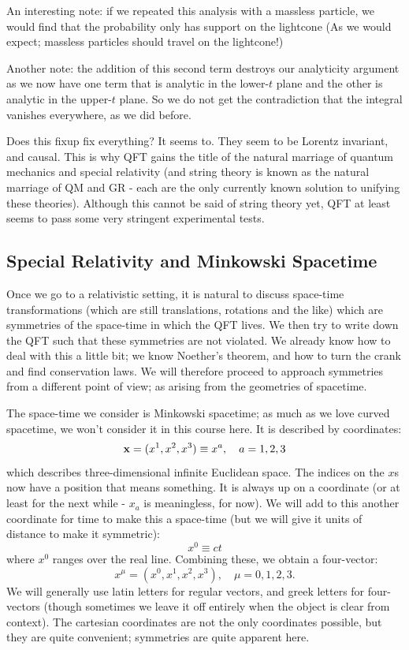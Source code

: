 An interesting note: if we repeated this analysis with a massless particle, we would find that the probability only has support on the lightcone (As we would expect; massless particles should travel on the lightcone!)

Another note: the addition of this second term destroys our analyticity argument as we now have one term that is analytic in the lower-$t$ plane and the other is analytic in the upper-$t$ plane. So we do not get the contradiction that the integral vanishes everywhere, as we did before.

Does this fixup fix everything? It seems to. They seem to be Lorentz invariant, and causal. This is why QFT gains the title of the natural marriage of quantum mechanics and special relativity (and string theory is known as the natural marriage of QM and GR - each are the only currently known solution to unifying these theories). Although this cannot be said of string theory yet, QFT at least seems to pass some very stringent experimental tests.

\subsection{Special Relativity and Minkowski Spacetime}
Once we go to a relativistic setting, it is natural to discuss space-time transformations (which are still translations, rotations and the like) which are symmetries of the space-time in which the QFT lives. We then try to write down the QFT such that these symmetries are not violated. We already know how to deal with this a little bit; we know Noether's theorem, and how to turn the crank and find conservation laws. We will therefore proceed to approach symmetries from a different point of view; as arising from the geometries of spacetime.

The space-time we consider is Minkowski spacetime; as much as we love curved spacetime, we won't consider it in this course here. It is described by coordinates:
\begin{equation}
    \mathbf{x} = (x^1, x^2, x^3) \equiv x^a, \quad a = 1,2,3
\end{equation}
which describes three-dimensional infinite Euclidean space. The indices on the $x$s now have a position that means something. It is always up on a coordinate (or at least for the next while - $x_a$ is meaningless, for now). We will add to this another coordinate for time to make this a space-time (but we will give it units of distance to make it symmetric):
\begin{equation}
    x^0 \equiv ct
\end{equation}
where $x^0$ ranges over the real line. Combining these, we obtain a four-vector:
\begin{equation}
    x^\mu = (x^0, x^1, x^2, x^3), \quad \mu=0,1,2,3.
\end{equation}
We will generally use latin letters for regular vectors, and greek letters for four-vectors (though sometimes we leave it off entirely when the object is clear from context). The cartesian coordinates are not the only coordinates possible, but they are quite convenient; symmetries are quite apparent here.

